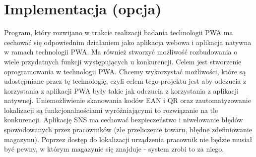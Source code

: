 \documentclass[../main.tex]{subfiles}
\begin{document}
\section{Implementacja (opcja)}
Program, który rozwijano w trakcie realizacji badania technologii PWA ma cechować się odpowiednim działaniem jako aplikacja webowa i aplikacja natywna w ramach technologii PWA. Ma również stworzyć możliwość rozbudowania o wiele przydatnych funkcji występujących u konkurencji. Celem jest stworzenie oprogramowania w technologii PWA. Chcemy wykorzystać możliwości, które są udostępniane przez tę technologię, czyli celem tego projektu jest aby odczucia z korzystania z aplikacji PWA były takie jak odczucia z korzystania z aplikacji natywnej. Uniemożliwienie skanowania kodów EAN i QR oraz zautomatyzowanie lokalizacji są funkcjonalnościami wyróżniającymi to rozwiązanie na tle konkurencji. Aplikację SNS ma cechować bezpieczeństwo i niwelowanie błędów spowodowanych przez pracowników (złe przeliczenie towaru, błędne zdefiniowanie magazynu). Poprzez dostęp do lokalizacji urządzenia pracownik nie będzie musiał być pewny, w którym magazynie się znajduje - system zrobi to za niego.

    
    \newpage
    
    \newpage
          
\end{document}
